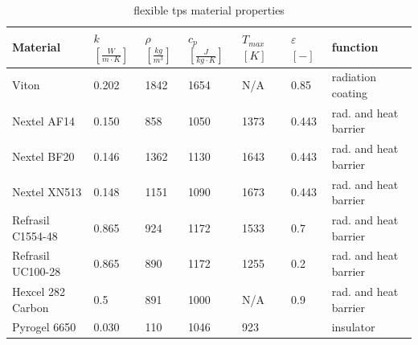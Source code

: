 \begin{table}[H]
	\caption {flexible \acrfull{tps} material properties}
	\centering
	\begin{tabular}{|l|l|l|l|l|l|l|}
		\hline
		\textbf{Material}         & \textbf{ $ k $ $ \left[ \frac{W}{m \cdot K} \right] $} & \textbf{ $ \rho $ $ \left[ \frac{kg}{m^3} \right] $} & \textbf{  $ c_{p} $ $ \left[ \frac{J}{kg \cdot K} \right] $ }& \textbf{ $ T_{max} $ $ [ K ] $} &\textbf{ $ \varepsilon $ $ [ - ] $} & \textbf{function} \\[1.6ex]   \hline \hline
		Viton       & 0.202 & 1842 & 1654 & N/A	 & 0.85 & radiation coating
		\\ \hline
		Nextel AF14       & 0.150                                                 & 858                                        & 1050                                            & 1373	 & 0.443    & rad. and heat barrier                                 \\ \hline
		Nextel BF20       & 0.146 
		& 1362                                        & 1130 
		& 1643	 & 0.443  & rad. and heat barrier                                  
		\\ \hline
		Nextel XN513      & 0.148                                                 & 1151                                       & 1090                                            & 1673	 & 0.443           & rad. and heat barrier                               \\ \hline
		Refrasil C1554-48 & 0.865                                                 & 924                                        & 1172                                            & 1533	 & 0.7     & rad. and heat barrier                                       \\ \hline
		Refrasil UC100-28 & 0.865                                                 & 890                                        & 1172                                            & 1255  & 0.2       & rad. and heat barrier                                    \\ \hline
		Hexcel 282 Carbon & 0.5                                                   & 891                                        & 1000                                            & N/A 	 & 0.9      & rad. and heat barrier                                     \\ \hline
		Pyrogel 6650      & 0.030                                                 & 110                                        & 1046                                            & 923    & ~        & insulator                                  \\ \hline

\end{tabular}
\end{table}
